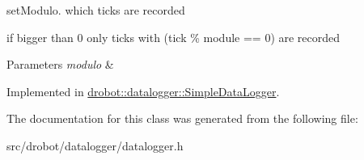 set\-Modulo. which ticks are recorded 

if bigger than 0 only ticks with (tick \% module == 0) are recorded 
\begin{DoxyParams}{Parameters}
{\em modulo} & \\
\hline
\end{DoxyParams}


Implemented in \hyperlink{classdrobot_1_1datalogger_1_1SimpleDataLogger_a4365669efc4d0950cf21c30be8650a88}{drobot\-::datalogger\-::\-Simple\-Data\-Logger}.



The documentation for this class was generated from the following file\-:\begin{DoxyCompactItemize}
\item 
src/drobot/datalogger/datalogger.\-h\end{DoxyCompactItemize}
